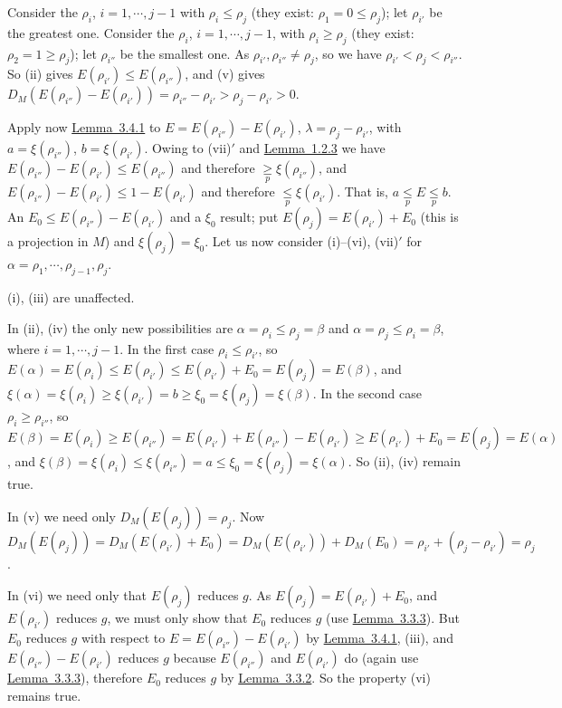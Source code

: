 \documentclass[twoside,leqno]{article}
\newcommand{\StatementRef}[2]{\hyperlink{stmt:#1}{#2}}
\begin{document}
Consider the $\rho_i$, $i=1,\cdots,j-1$ with $\rho_i\leq\rho_j$ (they
exist: $\rho_1=0\leq\rho_j$); let $\rho_{i'}$ be the greatest one. Consider
the $\rho_i$, $i=1,\cdots,j-1$, with $\rho_i\geq\rho_j$ (they exist:
$\rho_2=1\geq\rho_j$); let $\rho_{i''}$ be the smallest one. As
$\rho_{i'},\rho_{i''}\ne\rho_j$, so we have
$\rho_{i'}<\rho_j<\rho_{i''}$. So (ii) gives
$E(\rho_{i'})\leq E(\rho_{i''})$, and (v) gives
\(D_M(E(\rho_{i''})-E(\rho_{i'}))
=\rho_{i''}-\rho_{i'}>\rho_j-\rho_{i'}>0\).

Apply now \StatementRef{lemma:3.4.1}{Lemma~3.4.1} to
\(E=E(\rho_{i''})-E(\rho_{i'})\),
\(\lambda=\rho_j-\rho_{i'}\),
with $a=\xi(\rho_{i''})$, $b=\xi(\rho_{i'})$. Owing to (vii)$'$ and
\StatementRef{lemma:1.2.3}{Lemma~1.2.3} we have
$E(\rho_{i''})-E(\rho_{i'})\leq E(\rho_{i''})$ and therefore
$\mathrel{\underset p{\geq}}\xi(\rho_{i''})$, and
$E(\rho_{i''})-E(\rho_{i'})\leq1-E(\rho_{i'})$ and therefore
$\mathrel{\underset p{\leq}}\xi(\rho_{i'})$. That is,
$a\mathrel{\underset p{\leq}}E\mathrel{\underset p{\leq}}b$. An
$E_0\leq E(\rho_{i''})-E(\rho_{i'})$ and a $\xi_0$ result; put
\(E(\rho_j)=E(\rho_{i'})+E_0\) (this is a projection in $M$) and
\(\xi(\rho_j)=\xi_0\).
Let us now consider (i)--(vi), (vii)$'$ for
$\alpha=\rho_1,\cdots,\rho_{j-1},\rho_j$.

(i), (iii) are unaffected.

In (ii), (iv) the only new possibilities are
$\alpha=\rho_i\leq\rho_j=\beta$ and
$\alpha=\rho_j\leq\rho_i=\beta$, where $i=1,\cdots,j-1$. In the first case
$\rho_i\leq\rho_{i'}$, so
\(E(\alpha)=E(\rho_i)\leq E(\rho_{i'})
\leq E(\rho_{i'})+E_0=E(\rho_j)=E(\beta)\), and
\(\xi(\alpha)=\xi(\rho_i)\geq\xi(\rho_{i'})=b
\geq\xi_0=\xi(\rho_j)=\xi(\beta)\).
In the second case $\rho_i\geq\rho_{i''}$, so
\(E(\beta)=E(\rho_i)\geq E(\rho_{i''})
=E(\rho_{i'})+E(\rho_{i''})-E(\rho_{i'})
\geq E(\rho_{i'})+E_0=E(\rho_j)=E(\alpha)\), and
\(\xi(\beta)=\xi(\rho_i)\leq\xi(\rho_{i''})=a
\leq\xi_0=\xi(\rho_j)=\xi(\alpha)\).
So (ii), (iv) remain true.

In (v) we need only $D_M(E(\rho_j))=\rho_j$. Now
\(D_M(E(\rho_j))=D_M(E(\rho_{i'})+E_0)
=D_M(E(\rho_{i'}))+D_M(E_0)
=\rho_{i'}+(\rho_j-\rho_{i'})=\rho_j\).

In (vi) we need only that $E(\rho_j)$ reduces $g$. As
$E(\rho_j)=E(\rho_{i'})+E_0$, and $E(\rho_{i'})$ reduces $g$, we must only
show that $E_0$ reduces $g$ (use
\StatementRef{lemma:3.3.3}{Lemma~3.3.3}). But $E_0$ reduces $g$ with
respect to $E=E(\rho_{i''})-E(\rho_{i'})$ by
\StatementRef{lemma:3.4.1}{Lemma~3.4.1}, (iii), and
$E(\rho_{i''})-E(\rho_{i'})$ reduces $g$ because $E(\rho_{i''})$ and
$E(\rho_{i'})$ do (again use
\StatementRef{lemma:3.3.3}{Lemma~3.3.3}), therefore $E_0$ reduces $g$ by
\StatementRef{lemma:3.3.2}{Lemma~3.3.2}. So the property (vi) remains true.
\end{document}
